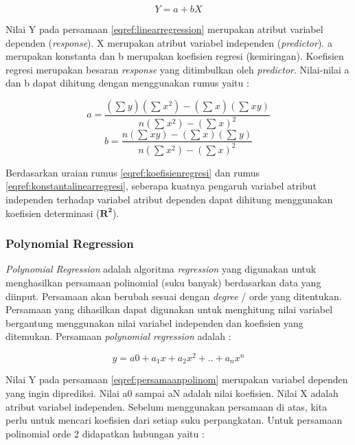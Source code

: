 \begin{equation}
 Y = a + bX
\label{eqref:linearregression}
\end{equation}


	
Nilai Y pada persamaan \eqref{eqref:linearregression} merupakan atribut variabel dependen (\textit{response}). X merupakan atribut variabel independen (\textit{predictor}). a merupakan konstanta dan b merupakan koefisien regresi (kemiringan). Koefisien regresi merupakan besaran \textit{response} yang ditimbulkan oleh \textit{predictor}. Nilai-nilai a dan b dapat dihitung dengan menggunakan rumus yaitu : 
		
		\begin{equation}
		 a = \frac{(\sum_{}^{} y)(\sum_{}^{} x^2) - (\sum_{}^{} x)(\sum{}^{} xy)}{n(\sum{}^{} x^2)-(\sum{}^{} x)^2}   
		 \label{eqref:konstantalinearregresi}
		\end{equation}
		\begin{equation}
		b = \frac{n(\sum{}^{} xy)-(\sum{}^{} x)(\sum{}^{} y)}{n(\sum{}^{} x^2)-(\sum{}^{} x)^2}
		\label{eqref:koefisienregresi}
		\end{equation}

Berdasarkan uraian rumus \eqref{eqref:koefisienregresi} dan rumus \eqref{eqref:konstantalinearregresi}, seberapa kuatnya pengaruh variabel atribut independen terhadap variabel  atribut dependen dapat dihitung menggunakan koefisien determinasi ($\mathbf{R^2}$).



		
\subsubsection{Polynomial Regression}
 \textit{Polynomial Regression} adalah algoritma \textit{regression} yang digunakan untuk menghasilkan persamaan polinomial (suku banyak) berdasarkan data yang diinput. Persamaan  akan berubah sesuai dengan \textit{degree} / orde yang ditentukan. Persamaan yang dihasilkan dapat digunakan untuk menghitung nilai variabel bergantung menggunakan nilai variabel independen dan koefisien yang ditemukan. Persamaan \textit{polynomial regression} adalah : 
		
		
		\begin{equation}
		   y = a0 + a_1x + a_2x^2 + .. +  a_n x^n     
		   \label{eqref:persamaanpolinom}
		\end{equation}
		
		
Nilai Y pada persamaan \ref{eqref:persamaanpolinom} merupakan variabel dependen yang ingin diprediksi. Nilai a0 sampai aN adalah nilai koefisien. Nilai X adalah atribut variabel independen. Sebelum menggunakan persamaan di atas, kita perlu untuk mencari koefisien dari setiap suku perpangkatan. Untuk persamaan polinomial orde 2 didapatkan hubungan yaitu : 
		
